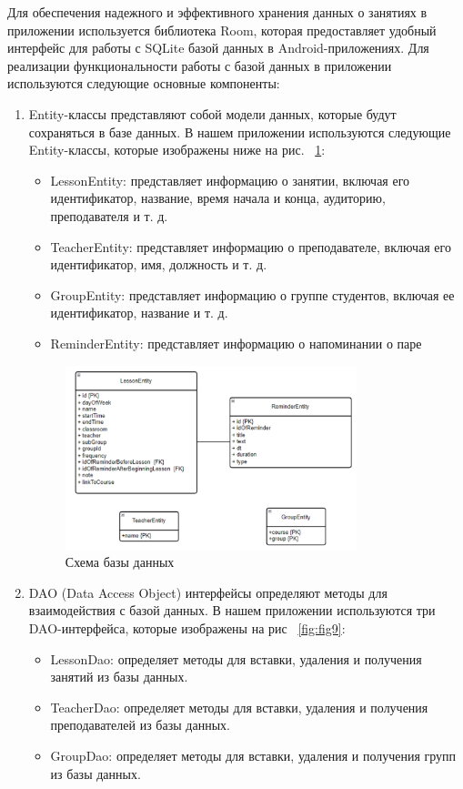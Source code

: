 \documentclass{vsureport}
\begin{document}
Для обеспечения надежного и эффективного хранения данных о занятиях в приложении используется библиотека Room, которая предоставляет удобный интерфейс для работы с SQLite базой данных в Android-приложениях. Для реализации функциональности работы с базой данных в приложении используются следующие основные компоненты:
\begin{enumerate}
	\item Entity-классы представляют собой модели данных, которые будут сохраняться в базе данных. В нашем приложении используются следующие Entity-классы, которые изображены ниже на рис. ~\ref{fig:fig8}:
		\begin{itemize}
		\item LessonEntity: представляет информацию о занятии, включая его идентификатор, название, время начала и конца, аудиторию, преподавателя и т. д.
		\item TeacherEntity: представляет информацию о преподавателе, включая его идентификатор, имя, должность и т. д.
		\item GroupEntity: представляет информацию о группе студентов, включая ее идентификатор, название и т. д.
		\item ReminderEntity: представляет информацию о напоминании о паре
		\end{itemize}
		\begin{figure}[H]
			\centering
			\includegraphics[width=0.8\textwidth]{8.png}
			\caption{Схема базы данных}
			\label{fig:fig8}
		\end{figure} 
		
	\item DAO (Data Access Object) интерфейсы определяют методы для взаимодействия с базой данных. В нашем приложении используются три DAO-интерфейса, которые изображены на рис ~\ref{fig:fig9}:
		\begin{itemize}
		\item LessonDao: определяет методы для вставки, удаления и получения занятий из базы данных.
		\item TeacherDao: определяет методы для вставки, удаления и получения преподавателей из базы данных.
		\item GroupDao: определяет методы для вставки, удаления и получения групп из базы данных.
		\end{itemize}
\end{enumerate}
\end{document}
